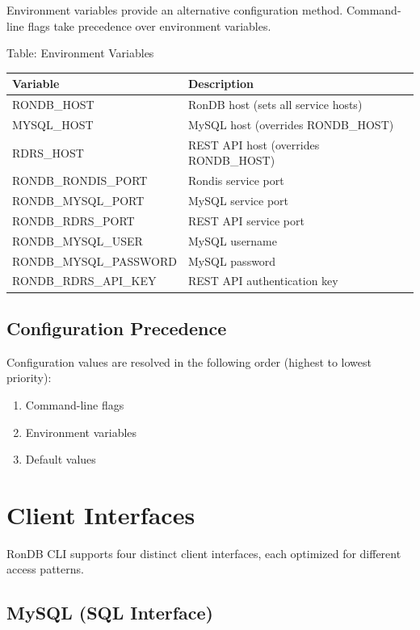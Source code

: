 \documentclass[11pt,a4paper]{report}
\begin{document}
Environment variables provide an alternative configuration method. Command-line flags take precedence over environment variables.

Table: Environment Variables

\begin{tabular}{ll}
\toprule
Variable & Description \\
\midrule
RONDB\_HOST & RonDB host (sets all service hosts) \\
MYSQL\_HOST & MySQL host (overrides RONDB\_HOST) \\
RDRS\_HOST & REST API host (overrides RONDB\_HOST) \\
RONDB\_RONDIS\_PORT & Rondis service port \\
RONDB\_MYSQL\_PORT & MySQL service port \\
RONDB\_RDRS\_PORT & REST API service port \\
RONDB\_MYSQL\_USER & MySQL username \\
RONDB\_MYSQL\_PASSWORD & MySQL password \\
RONDB\_RDRS\_API\_KEY & REST API authentication key \\
\bottomrule
\end{tabular}

\section{Configuration Precedence}

Configuration values are resolved in the following order (highest to lowest priority):
\begin{enumerate}
    \item Command-line flags
    \item Environment variables
    \item Default values
\end{enumerate}

\chapter{Client Interfaces}

RonDB CLI supports four distinct client interfaces, each optimized for different access patterns.

\section{MySQL (SQL Interface)}
\end{document}
